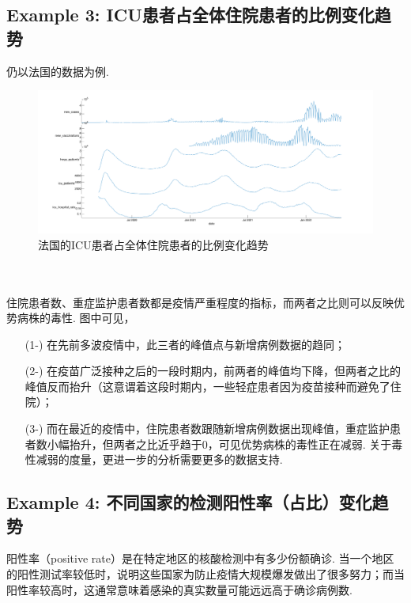 \documentclass[a4paper, titlepage]{article}
\begin{document}
    \subsection{Example 3: ICU患者占全体住院患者的比例变化趋势}
    仍以法国的数据为例. \\
    \begin{minipage}{\textwidth}
        \begin{figure}[H]
            \centering
            \includegraphics[width=\textwidth]{./images/France_ICU_Hospital.png}
            \vspace{-2em}
            \caption{法国的ICU患者占全体住院患者的比例变化趋势}
            \label{images:France_ICU_Hospital}
        \end{figure}
    \end{minipage}\\\quad\\
    住院患者数、重症监护患者数都是疫情严重程度的指标，而两者之比则可以反映优势病株的毒性. 图中可见，
    \begin{enumerate}
        \item [(1-)] 在先前多波疫情中，此三者的峰值点与新增病例数据的趋同；
        \item [(2-)] 在疫苗广泛接种之后的一段时期内，前两者的峰值均下降，但两者之比的峰值反而抬升（{\kaishu 这意谓着这段时期内，一些轻症患者因为疫苗接种而避免了住院}）；
        \item [(3-)] 而在最近的疫情中，住院患者数跟随新增病例数据出现峰值，重症监护患者数小幅抬升，但两者之比近乎趋于$0$，可见优势病株的毒性正在减弱. 关于毒性减弱的度量，更进一步的分析需要更多的数据支持.
    \end{enumerate}
    \subsection{Example 4: 不同国家的检测阳性率（占比）变化趋势}
    阳性率（positive rate）是在特定地区的核酸检测中有多少份额确诊. 当一个地区的阳性测试率较低时，说明这些国家为防止疫情大规模爆发做出了很多努力；而当阳性率较高时，这通常意味着感染的真实数量可能远远高于确诊病例数.
\end{document}
